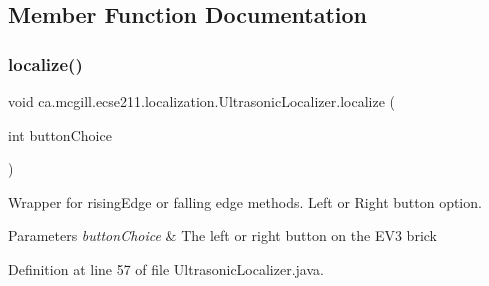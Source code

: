\subsection{Member Function Documentation}
\mbox{\label{classca_1_1mcgill_1_1ecse211_1_1localization_1_1_ultrasonic_localizer_ab78196997d7409aec0c35603686989ad}} 
\subsubsection{\texorpdfstring{localize()}{localize()}}
{\footnotesize\ttfamily void ca.\+mcgill.\+ecse211.\+localization.\+Ultrasonic\+Localizer.\+localize (\begin{DoxyParamCaption}\item[{int}]{button\+Choice }\end{DoxyParamCaption})}

Wrapper for rising\+Edge or falling edge methods. Left or Right button option.


\begin{DoxyParams}{Parameters}
{\em button\+Choice} & The left or right button on the E\+V3 brick \\
\hline
\end{DoxyParams}


Definition at line 57 of file Ultrasonic\+Localizer.\+java.


